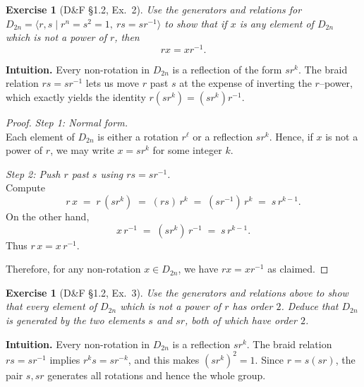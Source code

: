 \documentclass[12pt]{article}
\newtheorem{exercise}[theorem]{Exercise}
\theoremstyle{definition}
\begin{document}
\newpage

\begin{exercise}[D\&F §1.2, Ex.~2]
Use the generators and relations for $D_{2n}=\langle r,s \mid r^{n}=s^{2}=1,\ rs=sr^{-1}\rangle$
to show that if $x$ is any element of $D_{2n}$ which is not a power of $r$, then
\[
rx = xr^{-1}.
\]
\end{exercise}

\dotfill

\noindent
\textbf{Intuition.}
Every non-rotation in $D_{2n}$ is a reflection of the form $sr^{k}$. The braid relation
$rs=sr^{-1}$ lets us move $r$ past $s$ at the expense of inverting the $r$–power, which
exactly yields the identity $r(sr^{k})=(sr^{k})r^{-1}$.

\dotfill

\begin{proof}
\noindent\emph{Step 1: Normal form.}\\

\noindent
Each element of $D_{2n}$ is either a rotation $r^{\ell}$ or a reflection $sr^{k}$. Hence,
if $x$ is not a power of $r$, we may write $x=sr^{k}$ for some integer $k$.

\dotfill

\noindent\emph{Step 2: Push $r$ past $s$ using $rs=sr^{-1}$.}\\

\noindent
Compute
\[
r\,x \;=\; r\,(sr^{k}) \;=\; (rs)\,r^{k} \;=\; (sr^{-1})\,r^{k} \;=\; s\,r^{k-1}.
\]
On the other hand,
\[
x\,r^{-1} \;=\; (sr^{k})\,r^{-1} \;=\; s\,r^{k-1}.
\]
Thus $r\,x=x\,r^{-1}$.

\dotfill

Therefore, for any non-rotation $x\in D_{2n}$, we have $rx=xr^{-1}$ as claimed.
\end{proof}

\newpage

\begin{exercise}[D\&F §1.2, Ex.~3]
Use the generators and relations above to show that every element of $D_{2n}$ which is not a power
of $r$ has order $2$. Deduce that $D_{2n}$ is generated by the two elements $s$ and $sr$, both of which
have order $2$.
\end{exercise}

\dotfill

\noindent
\textbf{Intuition.}
Every non-rotation in $D_{2n}$ is a reflection $sr^{k}$. The braid relation $rs=sr^{-1}$
implies $r^{k}s = sr^{-k}$, and this makes $(sr^{k})^{2}=1$. Since $r=s(sr)$, the pair $s, sr$
generates all rotations and hence the whole group.
\end{document}
